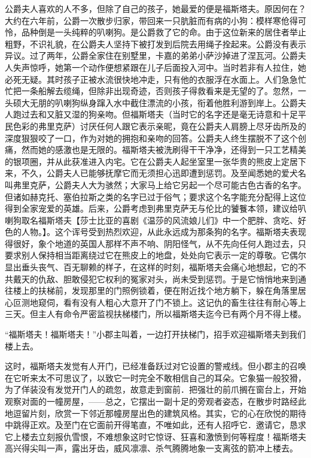 \documentclass[12pt, UTF8]{ctexbook}
\begin{document}
\par 公爵夫人喜欢的人不多，但除了自己的孩子，她最爱的便是福斯塔夫。原因何在？大约在六年前，公爵一次散步归家，带回来一只肮脏而有病的小狗：模样寒伧得可怜，品种倒是一头纯粹的叭喇狗。是公爵救了它的命。由于这位新来的居住者举止粗野，不识礼貌，在公爵夫人坚持下被打发到后院去用绳子拴起来。公爵没有表示异议。过了两年，公爵全家住在别墅里，卡嘉的弟弟小萨沙掉进了涅瓦河。公爵夫人失声惊呼，她第一个动作便想紧跟在儿子后面投入河中。当时若非有人拉住，她必死无疑。其时孩子正被水流很快地冲走，只有他的衣服浮在水面上。人们急急忙忙把一条船解去缆绳，但除非出现奇迹，否则孩子得救看来是无望的了。忽然，一头硕大无朋的叭喇狗纵身蹿入水中截住漂流的小孩，衔着他胜利游到岸上。公爵夫人跑过去和又脏又湿的狗亲吻。但福斯塔夫（当时它的名字还是毫无诗意和十足平民色彩的弗里克萨）讨厌任何人跟它表示亲昵，竟在公爵夫人肩膀上尽牙齿所及的深度狠狠咬了一口，作为对她的拥抱和亲吻的回答。公爵夫人终生摆脱不了这个创痛，然而她的感激也是无限的。福斯塔夫被洗刷得干干净净，还得到一只工艺精美的银项圈，并从此获准进入内宅。它在公爵夫人起坐室里一张华贵的熊皮上定居下来，不久，公爵夫人已能够抚摩它而无须担心迅即遭到惩罚。及至闻悉她的爱犬名叫弗里克萨，公爵夫人大为骇然；大家马上给它另起一个尽可能古色古香的名字。但诸如赫克托、塞伯拉斯之类的名字已过于俗气；要求这个名字能充分配得上这位得到全家宠爱的英雄。后来，公爵考虑到弗里克萨无与伦比的饕餮本领，建议给叭喇狗取名福斯塔夫【莎士比亚的喜剧《温莎的风流娘儿们》中一个肥胖、贪吃、好色的人物。】。这个诨号受到热烈欢迎，从此永远成为那条狗的名字。福斯塔夫表现得很好，象个地道的英国人那样不声不响、阴阳怪气，从不先向任何人跑过去，只要求别人保持相当距离绕过它在熊皮上的地盘，处处向它表示一定的尊敬。它偶尔显出垂头丧气、百无聊赖的样子，在这样的时刻，福斯塔夫会痛心地想起，它的不共戴天的仇敌、胆敢侵犯它权利的冤家对头，尚未受到惩罚。于是它悄悄地来到通往楼上的扶梯前，发现那里的门照例锁着，便在附近找个地方躺下，躲在角落里居心叵测地窥伺，看有没有人粗心大意开了门不锁上。这记仇的畜生往往有耐心等上三天。但主人有命令严密监视扶梯楼门，所以福斯塔夫迄今已有两个月不得上楼。
\par “福斯塔夫！福斯塔夫！”小郡主叫着，一边打开扶梯门，招手欢迎福斯塔夫到我们楼上去。
\par 这时，福斯塔夫发觉有人开门，已经准备跃过对它设置的警戒线。但小郡主的召唤在它听来太不可思议了，以致它一时完全不敢相信自己的耳朵。它象猫一般狡猾，为了佯装没有发觉开门人的疏忽，故意走到窗前．把强壮的前爪搁在窗台上，开始观察对面的一幢房屋，——总之，它摆出一副十足的旁观者姿态，在散步时路经此地逗留片刻，欣赏一下邻近那幢房屋出色的建筑风格。其实，它的心在欣悦的期待中跳得正欢。及至门在它面前开得笔直，不唯如此，还有人招呼它．邀请它，恳求它上楼去立刻报仇雪恨，不难想象这时它惊讶、狂喜和激愤到何等程度！福斯塔夫高兴得尖叫一声，露出牙齿，威风凛凛、杀气腾腾地象一支离弦的箭冲上楼去。
\end{document}
